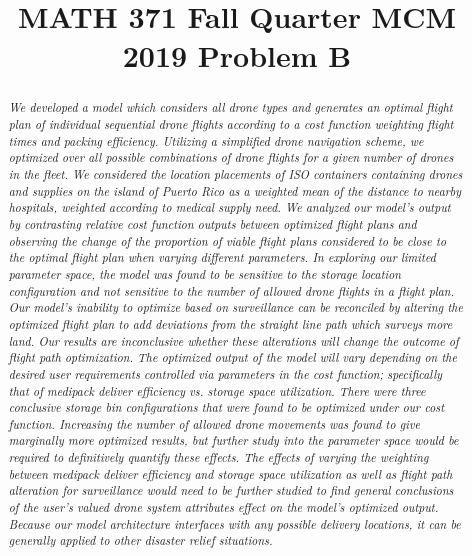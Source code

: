 \documentclass[twocolumn,10pt]{asme2ej}
\title{MATH 371 Fall Quarter MCM 2019 Problem B}
\begin{document}
\maketitle


\begin{abstract}
{\it We developed a model which considers all drone types and generates an optimal flight plan of individual sequential drone flights according to a cost function weighting flight times and packing efficiency. Utilizing a simplified drone navigation scheme, we optimized over all possible combinations of drone flights for a given number of drones in the fleet. We considered the location placements of ISO containers containing drones and supplies on the island of Puerto Rico as a weighted mean of the distance to nearby hospitals, weighted according to medical supply need. We analyzed our model’s output by contrasting relative cost function outputs between optimized flight plans and observing the change of the proportion of viable flight plans considered to be close to the optimal flight plan when varying different parameters. In exploring our limited parameter space, the model was found to be sensitive to the storage location configuration and not sensitive to the number of allowed drone flights in a flight plan. Our model's inability to optimize based on surveillance can be reconciled by altering the optimized flight plan to add deviations from the straight line path which surveys more land. Our results are inconclusive whether these alterations will change the outcome of flight path optimization. The optimized output of the model will vary depending on the desired user requirements controlled via parameters in the cost function; specifically that of medipack deliver efficiency vs. storage space utilization. There were three conclusive storage bin configurations that were found to be optimized under our cost function. Increasing the number of allowed drone movements was found to give marginally more optimized results, but further study into the parameter space would be required to definitively quantify these effects. The effects of varying the weighting between medipack deliver efficiency and storage space utilization as well as flight path alteration for surveillance would need to be further studied to find general conclusions of the user's valued drone system attributes effect on the model's optimized output. Because our model architecture interfaces with any possible delivery locations, it can be generally applied to other disaster relief situations.
}
\end{abstract}
\end{document}
